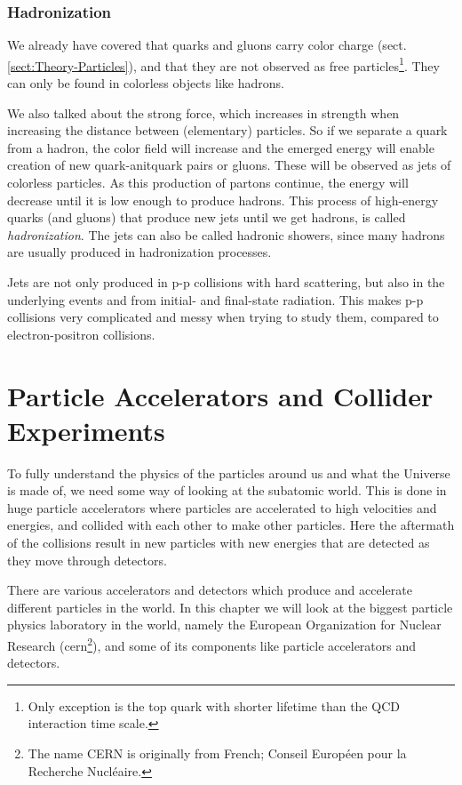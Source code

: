 \documentclass[a4paper, american, 12pt]{report}
\begin{document}
	
	\subsection{Hadronization}
	\label{subsect:Theory-Hadronization}
	We already have covered that quarks and gluons carry color charge (sect. \ref{sect:Theory-Particles}), and that they are not observed as free particles\footnote{Only exception is the top quark with shorter lifetime than the QCD interaction time scale.}. They can only be found in colorless objects like hadrons. 
	
	We also talked about the strong force, which increases in strength when increasing the distance between (elementary) particles. So if we separate a quark from a hadron, the color field will increase and the emerged energy will enable creation of new quark-anitquark pairs or gluons. These will be observed as jets of colorless particles. As this production of partons continue, the energy will decrease until it is low enough to produce hadrons. This process of high-energy quarks (and gluons) that produce new jets until we get hadrons, is called \textit{hadronization}. The jets can also be called hadronic showers, since many hadrons are usually produced in hadronization processes.
	
	Jets are not only produced in p-p collisions with hard scattering, but also in the underlying events and from initial- and final-state radiation. This makes p-p collisions very complicated and messy when trying to study them, compared to electron-positron collisions.	
	
	
	\chapter{Particle Accelerators and Collider Experiments}
	\label{chap:Theory-Part_accelerators}
	To fully understand the physics of the particles around us and what the Universe is made of, we need some way of looking at the subatomic world. This is done in huge particle accelerators where particles are accelerated to high velocities and energies, and collided with each other to make other particles. Here the aftermath of the collisions result in new particles with new energies that are detected as they move through detectors. 
	
	There are various accelerators and detectors which produce and accelerate different particles in the world. In this chapter we will look at the biggest particle physics laboratory in the world, namely the European Organization for Nuclear Research (\acrshort{cern}\footnote{The name CERN is originally from French; Conseil Européen pour la Recherche Nucléaire.}), and some of its components like particle accelerators and detectors.
	
\end{document}
